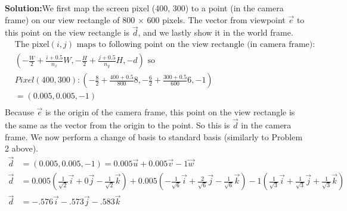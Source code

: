 \documentclass[a4paper, 12pt]{article}
\begin{document}
\begin{enumerate}
        \textbf{Solution:}We first map the screen pixel (400, 300) to a point (in the camera frame) on our view rectangle of 800 $\times$ 600 pixels. The vector from viewpoint $\vec{e}$ to this point on the view rectangle is $\vec{d}$, and we lastly show it in the world frame.
    \begin{align*}
        &\text{The pixel$(i, j)$ maps to following point on the view rectangle (in camera frame):}\\
        &\left( -\frac{W}{2} + \frac{i + 0.5}{n_x}W, -\frac{H}{2} + \frac{j + 0.5}{n_y}H, -d \right) \text{ so}\\
        &Pixel(400, 300) : \left( -\frac{8}{2} + \frac{400 + 0.5}{800}8, -\frac{6}{2} + \frac{300 + 0.5}{600}6, -1 \right)\\
        &= (0.005, 0.005, -1)\\
    \end{align*}
        Because $\vec{e}$ is the origin of the camera frame, this point on the view rectangle is the same as the vector from the origin to the point. So this is $\vec{d}$ in the camera frame. We now perform a change of basis to standard basis (similarly to Problem 2 above).
        \begin{align*}
            \vec{d} &= (0.005, 0.005, -1) = 0.005\vec{u} + 0.005\vec{v} - 1\vec{w}\\
            \vec{d} &= 0.005\left( \tfrac{1}{\sqrt{2}}\vec{i} + 0\vec{j} -\tfrac{1}{\sqrt{2}}\vec{k} \right) + 0.005\left(-\tfrac{1}{\sqrt{6}}\vec{i} + \tfrac{2}{\sqrt{6}}\vec{j} -\tfrac{1}{\sqrt{6}}\vec{k} \right) - 1\left( \tfrac{1}{\sqrt{3}}\vec{i} + \tfrac{1}{\sqrt{3}}\vec{j} + \tfrac{1}{\sqrt{3}}\vec{k} \right)\\
            \vec{d} &= -.576\vec{i} - .573\vec{j} -.583\vec{k}\\
    \end{align*}


\end{enumerate}
\end{document}
